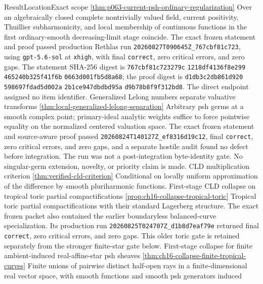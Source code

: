 \begin{AppLProvenanceLedger}{Result}{Location}{Exact scope}
  {\cref{thm:p063-current-psh-ordinary-regularization}}
  {Over an algebraically closed complete nontrivially valued field, current
   positivity, Thuillier subharmonicity, and local membership of continuous
   functions in the first ordinary-smooth decreasing-limit stage coincide.
   The exact frozen statement and proof passed production Rethlas run
   \nolinkurl{20260827T090645Z_767cbf81c723}, using
   \texttt{gpt-5.6-sol} at \texttt{xhigh}, with final \texttt{correct}, zero
   critical errors, and zero gaps.  The statement SHA-256 digest is
   \texttt{767cbf81c723279c}\allowbreak
   \texttt{1218df4136f8e299}\allowbreak
   \texttt{465240b325f41f6b}\allowbreak
   \texttt{0663d001fb5d8a68}; the proof digest is
   \texttt{d1db3c2db861d920}\allowbreak
   \texttt{598697fdad5d002a}\allowbreak
   \texttt{2b1ce947dbdbd95a}\allowbreak
   \texttt{d9b78b8f9f312bd8}.
   The direct endpoint assigned no item identifier.}
\AppLProvenanceRecord
  {Generalized Lelong numbers separate valuative transforms}
  {\cref{thm:local-generalized-lelong-separation}}
  {Arbitrary psh germs at a smooth complex point; primary-ideal analytic
   weights suffice to force pointwise equality on the normalized centered
   valuation space.  The exact frozen statement and source-aware proof passed
   \nolinkurl{20260824T140127Z_ef8316d19c12}, final \texttt{correct}, zero
   critical errors, and zero gaps, and a separate hostile audit found no
   defect before integration.  The run was not a post-integration
   byte-identity gate.  No singular-germ extension, novelty, or priority claim
   is made.}
\AppLProvenanceRecord
  {CLD multiplication criterion}
  {\cref{thm:verified-cld-criterion}}
  {Conditional on locally uniform approximation of the difference by
   smooth pluriharmonic functions.}
\AppLProvenanceRecord
  {First-stage CLD collapse on tropical toric partial compactifications}
  {\cref{prop:ch16-collapse-tropical-toric}}
  {Tropical toric partial compactifications with their standard Lagerberg
   structure.  The exact frozen packet also contained the earlier
   boundaryless balanced-curve specialization.  Its production run
   \nolinkurl{20260825T024707Z_d1b8d7eaf79e} returned final
   \texttt{correct}, zero critical errors, and zero gaps.  This older toric
   gate is retained separately from the stronger finite-star gate below.}
\AppLProvenanceRecord
  {First-stage collapse for finite ambient-induced real-affine-star psh sheaves}
  {\cref{thm:ch16-collapse-finite-tropical-curves}}
  {Finite unions of pairwise distinct half-open rays in a finite-dimensional
   real vector space, with smooth functions and smooth psh generators induced
}
\end{AppLProvenanceLedger}

